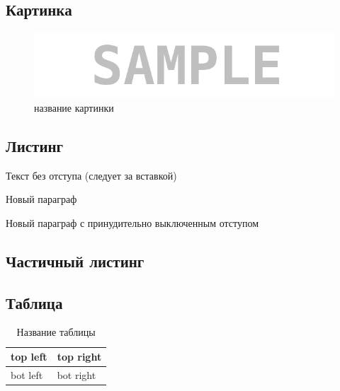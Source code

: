 \subsection*{Картинка}

\begin{figure}[H]
	\begin{center}
		\includegraphics[scale=0.7]{pics/sample}
		\caption{название картинки} 
		\label{pic:pic_name} %
	\end{center}
\end{figure}


\subsection*{Листинг}


\parindent=1cm %
Текст без отступа (следует за вставкой)

Новый параграф

\noindent Новый параграф с принудительно выключенным отступом


\subsection*{Частичный листинг}
\makeatletter
\def\lst@PlaceNumber{\llap{\normalfont
                \lst@numberstyle{\the\lst@lineno}\kern\lst@numbersep}}
\makeatother


\parindent=1cm

\subsection*{Таблица}

\begin{table}[H]
	\begin{center}
		\begin{tabular}{|l|l|}
			\hline
			top left & top right\\ \hline
			bot left & bot right\\ \hline
		\end{tabular}
		\caption{ Название таблицы}
		\label{tabular:tab_examp}
	\end{center}
\end{table}

